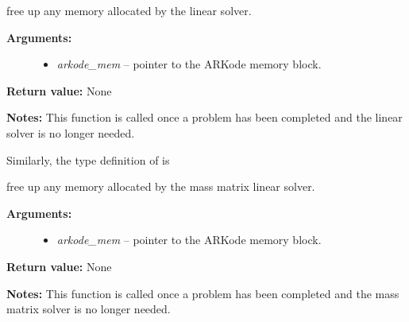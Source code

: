 \documentclass[letterpaper,10pt,english]{sphinxmanual}
\begin{document}
\begin{fulllineitems}
\label{linear_solvers/custom:lfree}
free up any memory allocated by the linear solver.
\begin{description}
\item[{\textbf{Arguments:}}] \leavevmode\begin{itemize}
\item {} 
\emph{arkode\_mem} -- pointer to the ARKode memory block.

\end{itemize}

\end{description}

\textbf{Return value:}  None

\textbf{Notes:}  This function is called once a problem has been
completed and the linear solver is no longer needed.

\end{fulllineitems}


Similarly, the type definition of {\hyperref[linear_solvers/custom:mfree]{}} is

\begin{fulllineitems}
\label{linear_solvers/custom:mfree}
free up any memory allocated by the mass matrix linear solver.
\begin{description}
\item[{\textbf{Arguments:}}] \leavevmode\begin{itemize}
\item {} 
\emph{arkode\_mem} -- pointer to the ARKode memory block.

\end{itemize}

\end{description}

\textbf{Return value:}  None

\textbf{Notes:}  This function is called once a problem has been
completed and the mass matrix solver is no longer needed.

\end{fulllineitems}
\end{document}
